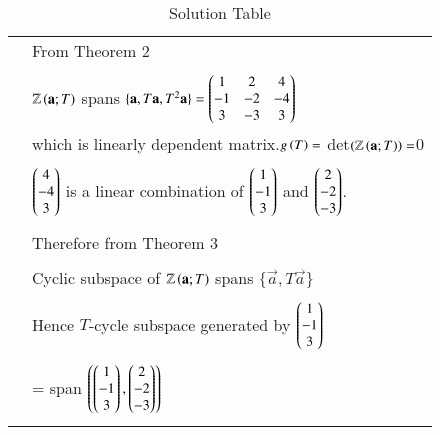 \documentclass[journal,12pt]{IEEEtran}
\begin{document}
\begin{longtable}{|l|l|}
&From Theorem 2\\
&\\
&$\mathbb{Z}\left(\mathbf{a};T\right)$ spans $\{\mathbf{a},T\mathbf{a},T^2\mathbf{a}\}=\begin{pmatrix}1&2&4\\-1&-2&-4\\3&-3&3\end{pmatrix}$\\
&which is linearly dependent matrix.$g\left(T\right)=$ det$\left(\mathbb{Z}\left(\mathbf{a};T\right)\right)=$0\\
&\\
&$\begin{pmatrix}4\\-4\\3\end{pmatrix}$ is a linear combination of $\begin{pmatrix}1\\-1\\3\end{pmatrix}$ and $\begin{pmatrix}2\\-2\\-3\end{pmatrix}$.\\
&\\
& Therefore from Theorem 3\\
&\\
&Cyclic subspace of $\mathbb{Z}\left(\mathbf{a};T\right)$ spans $\{\vec{a} , T\vec{a}\}$\\
&\\
&Hence $T$-cycle subspace generated by $\begin{pmatrix}1\\-1\\3\end{pmatrix}$\\
&\\
&= span $\left(\begin{pmatrix}1\\-1\\3\end{pmatrix},\begin{pmatrix}2\\-2\\-3\end{pmatrix}\right)$ \\

\hline

\caption{Solution Table}
\label{table:2}
\end{longtable}
\end{document}
